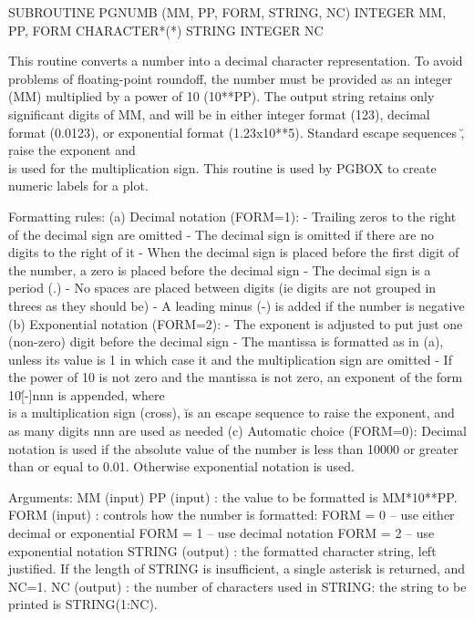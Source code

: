 {\eightpoint\begintt
      SUBROUTINE PGNUMB (MM, PP, FORM, STRING, NC)
      INTEGER MM, PP, FORM
      CHARACTER*(*) STRING
      INTEGER NC
 
This routine converts a number into a decimal character
representation. To avoid problems of floating-point roundoff, the
number must be provided as an integer (MM) multiplied by a power of 10
(10**PP).  The output string retains only significant digits of MM,
and will be in either integer format (123), decimal format (0.0123),
or exponential format (1.23x10**5). Standard escape sequences \u, \d 
raise the exponent and \\ is used for the multiplication sign.
This routine is used by PGBOX to create numeric labels for a plot.
 
Formatting rules:
  (a) Decimal notation (FORM=1):
      - Trailing zeros to the right of the decimal sign are
        omitted
      - The decimal sign is omitted if there are no digits
        to the right of it
      - When the decimal sign is placed before the first digit
        of the number, a zero is placed before the decimal sign
      - The decimal sign is a period (.)
      - No spaces are placed between digits (ie digits are not
        grouped in threes as they should be)
      - A leading minus (-) is added if the number is negative
  (b) Exponential notation (FORM=2):
      - The exponent is adjusted to put just one (non-zero)
        digit before the decimal sign
      - The mantissa is formatted as in (a), unless its value is
        1 in which case it and the multiplication sign are omitted
      - If the power of 10 is not zero and the mantissa is not
        zero, an exponent of the form \\10\u[-]nnn is appended,
        where \\ is a multiplication sign (cross), \u is an escape
        sequence to raise the exponent, and as many digits nnn
        are used as needed
  (c) Automatic choice (FORM=0):
        Decimal notation is used if the absolute value of the
        number is less than 10000 or greater than or equal to
        0.01. Otherwise exponential notation is used.
 
Arguments:
 MM     (input)
 PP     (input)  : the value to be formatted is MM*10**PP.
 FORM   (input)  : controls how the number is formatted:
                   FORM = 0 -- use either decimal or exponential
                   FORM = 1 -- use decimal notation
                   FORM = 2 -- use exponential notation
 STRING (output) : the formatted character string, left justified.
                   If the length of STRING is insufficient, a single
                   asterisk is returned, and NC=1.
 NC     (output) : the number of characters used in STRING:
                   the string to be printed is STRING(1:NC).
\endtt}

